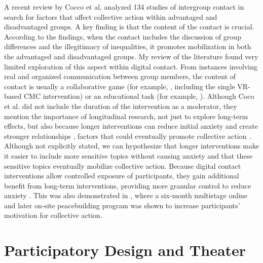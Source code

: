 \documentclass[dissertation,math,vertlayout,pdfa,colorlinks,nologo]{aaltoseries}
\begin{document}
A recent review by Cocco et al. \cite{coccoMobilizingSedativeEffects2024} analyzed 134 studies of intergroup contact in search for factors that affect collective action within advantaged and disadvantaged groups. A key finding is that the content of the contact is crucial. According to the findings, when the contact includes the discussion of group differences and the illegitimacy of inequalities, it promotes mobilization in both the advantaged and disadvantaged groups. My review of the literature found very limited exploration of this aspect within digital contact. From instances involving real and organized communication between group members, the content of contact is usually a collaborative game (for example, \cite{stiffPlayingWellOthers2020, tassinariInvestigatingInfluenceIntergroup2022, benatovGamingPeaceVirtual2021}, including the single VR-based CMC intervention) or an educational task (for example, \cite{waltherComputermediatedCommunicationReduction2015,enicOnlineContactsSupported2024, whiteDualIdentityelectronicContact2012}). Although Coco et al. did not include the duration of the intervention as a moderator, they mention the importance of longitudinal research, not just to explore long-term effects, but also because longer interventions can reduce initial anxiety and create stronger relationships \cite{troppAdaptationDiversityIndividual2019, macinnisHowCanIntergroup2015,pettigrewAdvancingIntergroupContact2021}, factors that could eventually promote collective action \cite{coccoMobilizingSedativeEffects2024}. Although not explicitly stated, we can hypothesize that longer interventions make it easier to include more sensitive topics without causing anxiety and that these sensitive topics eventually mobilize collective action. Because digital contact interventions allow controlled exposure of participants, they gain additional benefit from long-term interventions, providing more granular control to reduce anxiety \cite{amichai-hamburgerStructuredUnstructuredIntergroup2015}. This was also demonstrated in \cite{segalGoingHybridUsing2022}, where a six-month multistage online and later on-site peacebuilding program was shown to increase participants' motivation for collective action.

\section{Participatory Design and Theater}
\end{document}
